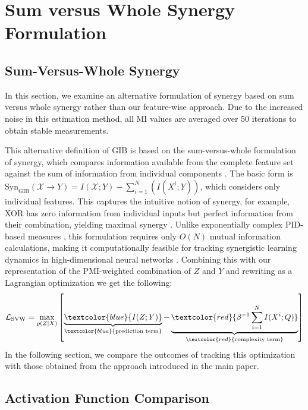 \documentclass{article}
\theoremstyle{definition}
\theoremstyle{remark}
\begin{document}
\section{Sum versus Whole Synergy Formulation}
\label{app:alt_synergy}

\subsection{Sum-Versus-Whole Synergy}
\label{app:sum_whole}
In this section, we examine an alternative formulation of synergy based on sum versus whole synergy rather than our feature-wise approach. Due to the increased noise in this estimation method, all MI values are averaged over 50 iterations to obtain stable measurements.

This alternative definition of GIB is based on the sum-versus-whole formulation of synergy, which compares information available from the complete feature set against the sum of information from individual components \citep{schneidman2003synergy}. The basic form is  $\text{Syn}_{\text{GIB}}(\mathcal{X} \to Y) = I(\mathcal{X}; Y) - \sum_{i=1}^{N} \left( I(X^i; Y)\right)$, which considers only individual features. This captures the intuitive notion of synergy, for example, XOR has zero information from individual inputs but perfect information from their combination, yielding maximal synergy \citep{bell2003co}. Unlike exponentially complex PID-based measures \citep{williams2010nonnegative}, this formulation requires only $O(N)$ mutual information calculations, making it computationally feasible for tracking synergistic learning dynamics in high-dimensional neural networks . Combining this with our representation of the PMI-weighted combination of $Z$ and $Y$ and rewriting as a Lagrangian optimization we get the following:
\begin{equation}
\mathcal{L}_{\text{SVW}} = \max_{p(Z|X)} \left[ \underbrace{\textcolor{blue}{I(Z;Y)}}_{\textcolor{blue}{\text{prediction term}}} - \underbrace{\textcolor{red}{\beta^{-1} \sum_{i=1}^{N} I(X^i; Q)}}_{\textcolor{red}{\text{complexity term}}} \right]
\end{equation}
In the following section, we compare the outcomes of tracking this optimization with those obtained from the approach introduced in the main paper.




\subsection{Activation Function Comparison}
\end{document}
